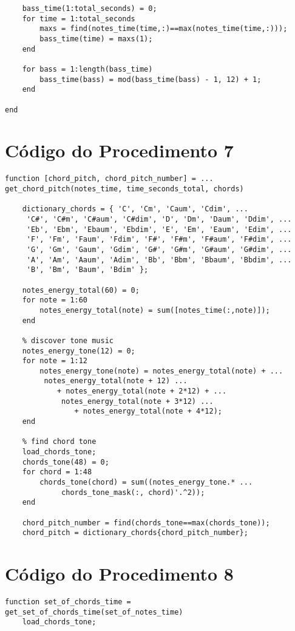 \begin{apendicesenv}
\begin{lstlisting}
    bass_time(1:total_seconds) = 0;
	for time = 1:total_seconds
		maxs = find(notes_time(time,:)==max(notes_time(time,:)));
		bass_time(time) = maxs(1);
	end

	for bass = 1:length(bass_time)
		bass_time(bass) = mod(bass_time(bass) - 1, 12) + 1;
	end

end
\end{lstlisting}

\section{Código do Procedimento 7}
\label{sec:codigo_procedimento_7}
\begin{lstlisting}
function [chord_pitch, chord_pitch_number] = ...
get_chord_pitch(notes_time, time_seconds_total, chords)
    
    dictionary_chords = { 'C', 'Cm', 'Caum', 'Cdim', ...
     'C#', 'C#m', 'C#aum', 'C#dim', 'D', 'Dm', 'Daum', 'Ddim', ...
     'Eb', 'Ebm', 'Ebaum', 'Ebdim', 'E', 'Em', 'Eaum', 'Edim', ...
     'F', 'Fm', 'Faum', 'Fdim', 'F#', 'F#m', 'F#aum', 'F#dim', ...
     'G', 'Gm', 'Gaum', 'Gdim', 'G#', 'G#m', 'G#aum', 'G#dim', ...
     'A', 'Am', 'Aaum', 'Adim', 'Bb', 'Bbm', 'Bbaum', 'Bbdim', ...
     'B', 'Bm', 'Baum', 'Bdim' };

    notes_energy_total(60) = 0;
    for note = 1:60
        notes_energy_total(note) = sum([notes_time(:,note)]);
    end

    % discover tone music
    notes_energy_tone(12) = 0;
    for note = 1:12
        notes_energy_tone(note) = notes_energy_total(note) + ...
         notes_energy_total(note + 12) ...
            + notes_energy_total(note + 2*12) + ...
             notes_energy_total(note + 3*12) ...
                + notes_energy_total(note + 4*12);
    end

    % find chord tone
    load_chords_tone;
    chords_tone(48) = 0;
    for chord = 1:48
        chords_tone(chord) = sum((notes_energy_tone.* ...
             chords_tone_mask(:, chord)'.^2));
    end

    chord_pitch_number = find(chords_tone==max(chords_tone));
    chord_pitch = dictionary_chords{chord_pitch_number};

\end{lstlisting}

\section{Código do Procedimento 8}
\label{sec:codigo_procedimento_8}
\begin{lstlisting}
function set_of_chords_time = get_set_of_chords_time(set_of_notes_time)
    load_chords_tone;


\end{lstlisting}
\end{apendicesenv}
